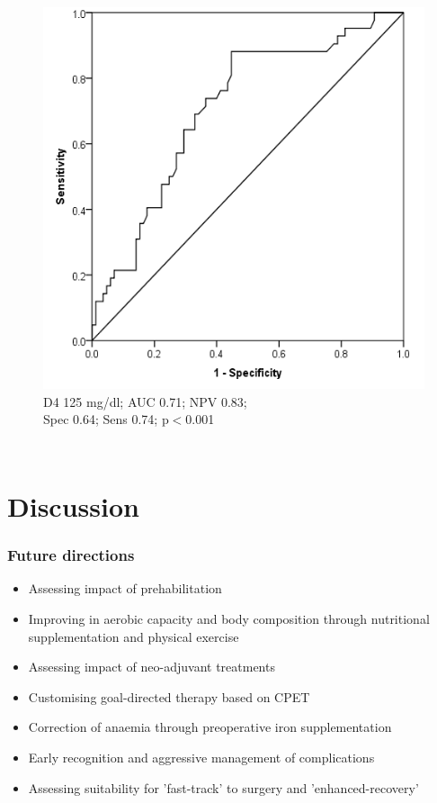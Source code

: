 \documentclass[10pt]{beamer}
\begin{document}
\begin{frame}
\begin{columns}
			\begin{figure}
				\includegraphics[width=\textwidth]{../Figures/crp_comp_ROC_infection_D4}
				\\{\scriptsize D4 125 mg/dl; AUC 0.71; NPV 0.83; \\Spec 0.64; Sens 0.74; p$<$0.001}
			\end{figure}
	\end{columns}
\end{frame}



\section[Chapter 7]{Discussion}
\begin{frame}
	\frametitle{Future directions}
	\begin{itemize}
		\item Assessing impact of prehabilitation
		\item Improving in aerobic capacity and body composition through nutritional supplementation and physical exercise
		\item Assessing impact of neo-adjuvant treatments
		\item Customising goal-directed therapy based on CPET
		\item Correction of anaemia through preoperative iron supplementation
		\item Early recognition and aggressive management of complications
		\item Assessing suitability for 'fast-track' to surgery and 'enhanced-recovery'
	\end{itemize}
\end{frame}
\end{document}
